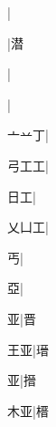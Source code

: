 \begin{multicols}{2}
{{}\mktsJzrVerticalBar{}{\cjk{}{\cnsym{}　}{\cnsym{}　}{\cnsym{}　}}|{}\par
{}\mktsJzrVerticalBar{}{\cjk{}{\cnsym{}　}{\cnsym{}　}{\cnsym{}　}}|{\cjk{}潜}\par
{}\mktsJzrVerticalBar{}{\cjk{}{\cnsym{}　}{\cnsym{}　}{\cnsym{}　}}|{}\par
{}\mktsJzrVerticalBar{}{\cjk{}{\cnsym{}　}{\cnsym{}　}{\cnsym{}　}}|{}\par
{\cjk{}亠{\cnxa{}䒑}丁}\mktsJzrVerticalBar{}{\cjk{}{\cnsym{}　}{\cnsym{}　}{\cnsym{}　}}|{}\par
{\cjk{}弓工工}|{}\par
{\cjk{}{\cnsym{}　}日工}\mktsJzrVerticalBar{}{\cjk{}{\cnsym{}　}{\cnsym{}　}{\cnsym{}　}}|{}\par
{\cjk{}乂凵工}|{}\par
{\cjk{}{\cnsym{}　}{\cnsym{}　}丐}\mktsJzrVerticalBar{}{\cjk{}{\cnsym{}　}{\cnsym{}　}{\cnsym{}　}}|{}\par
{\cjk{}{\cnsym{}　}{\cnsym{}　}亞}\mktsJzrVerticalBar{}{\cjk{}{\cnsym{}　}{\cnsym{}　}{\cnsym{}　}}|{}\par
{\cjk{}{\cnsym{}　}{\cnsym{}　}亚}\mktsJzrVerticalBar{}{\cjk{}{\cnsym{}　}{\cnsym{}　}{\cnsym{}　}}|{\cjk{}晋}\par
{\cjk{}{\cnsym{}　}王亚}\mktsJzrVerticalBar{}{\cjk{}{\cnsym{}　}{\cnsym{}　}{\cnsym{}　}}|{\cjk{}瑨}\par
{亚}\mktsJzrVerticalBar{}{\cjk{}{\cnsym{}　}{\cnsym{}　}{\cnsym{}　}}|{\cjk{}搢}\par
{\cjk{}{\cnsym{}　}木亚}\mktsJzrVerticalBar{}{\cjk{}{\cnsym{}　}{\cnsym{}　}{\cnsym{}　}}|{\cjk{}榗}\par
}
\end{multicols}
